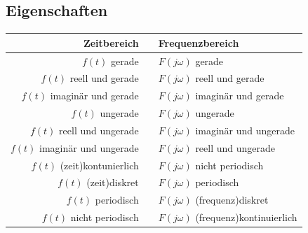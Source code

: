 				
		\subsection{Eigenschaften}
				
					\begin{tabular}{rcl}
						\hline 
							\textbf{Zeitbereich} & \laplace  & \textbf{Frequenzbereich} \\ 
						\hline 
						\hline
							$f(t)$ gerade & \laplace & $F(j \omega)$ gerade  \\ 
						\hline 
							$f(t)$ reell und gerade & \laplace & $F(j \omega)$ reell und gerade\\ 
						\hline 
							$f(t)$ imaginär und gerade & \laplace & $F(j \omega)$ imaginär und gerade \\ 
						\hline 
							$f(t)$ ungerade & \laplace & $F(j \omega)$ ungerade \\ 
						\hline 
							$f(t)$ reell und ungerade & \laplace & $F(j \omega)$ imaginär und ungerade \\ 
						\hline 
							$f(t)$ imaginär und ungerade & \laplace & $F(j \omega)$ reell und ungerade\\ 
						\hline 
							$f(t)$ (zeit)kontunierlich & \laplace & $F(j \omega)$ nicht periodisch \\ 
						\hline 
							$f(t)$ (zeit)diskret & \laplace & $F(j \omega)$ periodisch \\ 
						\hline 
							$f(t)$ periodisch & \laplace & $F(j \omega)$ (frequenz)diskret\\ 
						\hline 
							$f(t)$ nicht periodisch & \laplace & $F(j \omega)$ (frequenz)kontinuierlich\\ 
						\hline 
					\end{tabular} 
					
